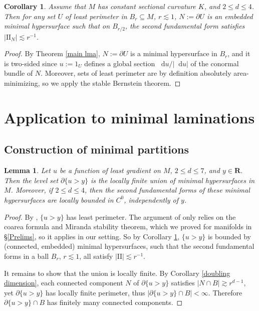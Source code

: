 \documentclass[reqno,10pt]{amsart}
\newcommand{\RR}{\mathbf{R}}
\newcommand*\dif{\mathop{}\!\mathrm{d}}
\newcommand{\Two}{\mathrm{I\!I}}
\newtheorem{lemma}[theorem]{Lemma}
\newtheorem{corollary}[theorem]{Corollary}
\theoremstyle{definition}
\numberwithin{equation}{section}
\begin{document}
\begin{corollary}\label{main lma with Two}
Assume that $M$ has constant sectional curvature $K$, and $2 \leq d \leq 4$.
Then for any set $U$ of least perimeter in $B_r \subseteq M$, $r \lesssim 1$, $N := \partial U$ is an embedded minimal hypersurface such that on $B_{r/2}$, the second fundamental form satisfies $|\Two_N| \lesssim r^{-1}$.
\end{corollary}
\begin{proof}
By Theorem \ref{main lma}, $N := \partial U$ is a minimal hypersurface in $B_r$, and it is two-sided since $u := 1_U$ defines a global section $\dif u/|\dif u|$ of the conormal bundle of $N$.
Moreover, sets of least perimeter are by definition absolutely area-minimizing, so we apply the stable Bernstein theorem.
\end{proof}



\section{Application to minimal laminations}\label{GornySec}
\subsection{Construction of minimal partitions}
\begin{lemma}\label{bounds on Two of least gradient}
Let $u$ be a function of least gradient on $M$, $2 \leq d \leq 7$, and $y \in \RR$. Then the level set $\partial \{u > y\}$ is the locally finite union of minimal hypersurfaces in $M$.
Moreover, if $2 \leq d \leq 4$, then the second fundamental forms of these minimal hypersurfaces are locally bounded in $C^0$, independently of $y$.
\end{lemma}
\begin{proof}
By \cite[Theorem 1]{BOMBIERI1969}, $\{u > y\}$ has least perimeter.
The argument of \cite{BOMBIERI1969} only relies on the coarea formula and Miranda stability theorem, which we proved for manifolds in \S\ref{Prelims}, so it applies in our setting.
So by Corollary \ref{main lma with Two}, $\{u > y\}$ is bounded by (connected, embedded) minimal hypersurfaces, such that the second fundamental forms in a ball $B_r$, $r \lesssim 1$, all satisfy $|\Two| \lesssim r^{-1}$.

It remains to show that the union is locally finite.
By Corollary \ref{doubling dimension}, each connected component $N$ of $\partial \{u > y\}$ satisfies $|N \cap B| \gtrsim r^{d - 1}$, yet $\partial \{u > y\}$ has locally finite perimeter, thus $|\partial \{u > y\} \cap B| < \infty$.
Therefore $\partial \{u > y\} \cap B$ has finitely many connected components.
\end{proof}
\end{document}
